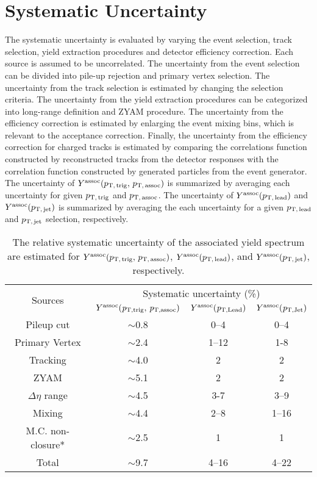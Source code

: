 \section{Systematic Uncertainty}
\label{sec:uncertainties}
The systematic uncertainty is evaluated by varying the event selection, track selection, yield extraction procedures and detector efficiency correction. Each source is assumed to be uncorrelated. The uncertainty from the event selection can be divided into pile-up rejection and primary vertex selection. The uncertainty from the track selection is estimated by changing the selection criteria. The uncertainty from the yield extraction procedures can be categorized into long-range definition and ZYAM procedure. The uncertainty from the efficiency correction is estimated by enlarging the event mixing bins, which is relevant to the acceptance correction.
Finally, the uncertainty from the efficiency correction for charged tracks is estimated by comparing the correlations function constructed by reconstructed tracks from the detector responses with the correlation function constructed by generated particles from the event generator.
The uncertainty of $Y^{\rm{assoc}}(p_\mathrm{T,\,trig},\,p_\mathrm{T,\,assoc})$ is summarized by averaging each uncertainty for given $p_\mathrm{T,\,trig}$ and $p_\mathrm{T,\,assoc}$. The uncertainty of $Y^{\rm{assoc}}(p_\mathrm{T,\,lead})$ and $Y^{\rm{assoc}}(p_\mathrm{T,\,jet})$ is summarized by averaging the each uncertainty for a given $p_\mathrm{T,\,lead}$ and $p_\mathrm{T,\,jet}$ selection, respectively.
\begin{table}[h!]
\centering
\begin{tabular}{|c|c|c|c|}
\hline 
\multirow{2}{*}{Sources}  & \multicolumn{3}{c|}{Systematic uncertainty (\%)} \\\cline{2-4}
         & $Y^{\rm{assoc}}(\it{p}_{\rm{T, trig}},\,\it{p}_{\rm{T, assoc}})$ & $Y^{\rm{assoc}}(\it{p}_{\rm{T, Lead}})$ & $Y^{\rm{assoc}}(\it{p}_{\rm{T, Jet}})$ \\ \hline \hline
Pileup cut			& $\sim$0.8	&0--4		&0--4		\\ \hline
Primary Vertex		& $\sim$2.4	&1--12	&1-8		\\ \hline

Tracking			& $\sim$4.0 	&2		&2		\\ \hline

ZYAM			& $\sim$5.1	&2		&2		\\ \hline
$\Delta\eta$ range	& $\sim$4.5	&3-7		&3--9		\\ \hline

Mixing			& $\sim$4.4	&2--8		&1--16	\\ \hline

M.C. non-closure*	& $\sim$2.5 	&1		&1		\\ \hline
Total 			& $\sim$9.7	&4--16	&4--22	\\ 
\hline 
\end{tabular}
\label{tab:syst}
\caption{The relative systematic uncertainty of the associated yield spectrum are estimated for $Y^{\rm{assoc}}(p_\mathrm{T,\,trig},\,p_\mathrm{T,\,assoc})$, $Y^{\rm{assoc}}(p_\mathrm{T,\,lead})$, and $Y^{\rm{assoc}}(p_\mathrm{T,\,jet})$, respectively.}
\end{table}

